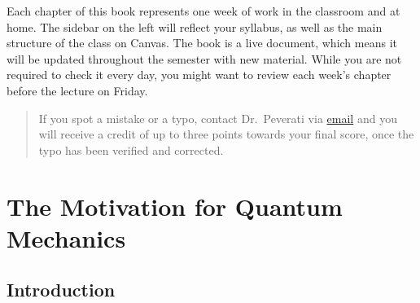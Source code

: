 \documentclass[
  9pt,
]{extbook}
\let\origdoublepage\cleardoublepage
\newcommand{\clearemptydoublepage}{%
  \clearpage
  {\pagestyle{empty}\origdoublepage}%
}
\let\cleardoublepage\clearemptydoublepage
\theoremstyle{definition}
\theoremstyle{definition}
\theoremstyle{definition}
\theoremstyle{remark}
\begin{document}
Each chapter of this book represents one week of work in the classroom and at home. The sidebar on the left will reflect your syllabus, as well as the main structure of the class on Canvas. The book is a live document, which means it will be updated throughout the semester with new material. While you are not required to check it every day, you might want to review each week's chapter before the lecture on Friday.

\begin{quote}
If you spot a mistake or a typo, contact Dr.~Peverati via \href{mailto:rpeverati@fit.edu}{email} and you will receive a credit of up to three points towards your final score, once the typo has been verified and corrected.
\end{quote}

\cleardoublepage
{}

\hypertarget{Motivation}{%
\chapter{The Motivation for Quantum Mechanics}\label{Motivation}}

\hypertarget{introduction}{%
\section{Introduction}\label{introduction}}
\end{document}
